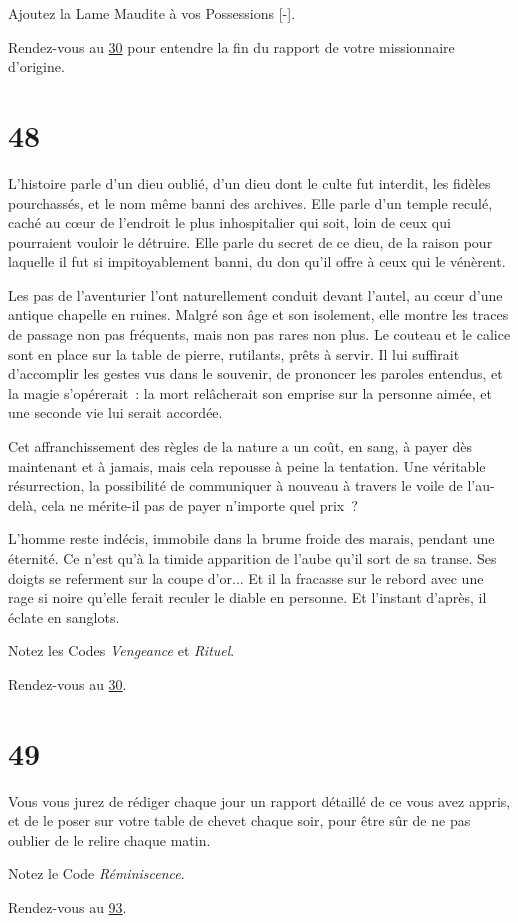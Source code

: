 \documentclass{report}
\newcommand{\gsection}[1]{
    \section{#1}
    \label{section-#1}
}
\newcommand{\glink}[1]{\hyperref[section-#1]{#1}}
\begin{document}
Ajoutez la Lame Maudite à vos Possessions [-].

Rendez-vous au \glink{30} pour entendre la fin du rapport de votre missionnaire d'origine.

\gsection{48}

L'histoire parle d'un dieu oublié, d'un dieu dont le culte fut interdit, les fidèles pourchassés, et le nom même banni des archives. Elle parle d'un temple reculé, caché au cœur de l'endroit le plus inhospitalier qui soit, loin de ceux qui pourraient vouloir le détruire. Elle parle du secret de ce dieu, de la raison pour laquelle il fut si impitoyablement banni, du don qu'il offre à ceux qui le vénèrent.

Les pas de l'aventurier l'ont naturellement conduit devant l'autel, au cœur d'une antique chapelle en ruines. Malgré son âge et son isolement, elle montre les traces de passage non pas fréquents, mais non pas rares non plus. Le couteau et le calice sont en place sur la table de pierre, rutilants, prêts à servir. Il lui suffirait d'accomplir les gestes vus dans le souvenir, de prononcer les paroles entendus, et la magie s'opérerait : la mort relâcherait son emprise sur la personne aimée, et une seconde vie lui serait accordée.

Cet affranchissement des règles de la nature a un coût, en sang, à payer dès maintenant et à jamais, mais cela repousse à peine la tentation. Une véritable résurrection, la possibilité de communiquer à nouveau à travers le voile de l'au-delà, cela ne mérite-il pas de payer n'importe quel prix ?

L'homme reste indécis, immobile dans la brume froide des marais, pendant une éternité. Ce n'est qu'à la timide apparition de l'aube qu'il sort de sa transe. Ses doigts se referment sur la coupe d'or... Et il la fracasse sur le rebord avec une rage si noire qu'elle ferait reculer le diable en personne. Et l'instant d'après, il éclate en sanglots.

Notez les Codes \emph{Vengeance} et \emph{Rituel}.

Rendez-vous au \glink{30}.

\gsection{49}

Vous vous jurez de rédiger chaque jour un rapport détaillé de ce vous avez appris, et de le poser sur votre table de chevet chaque soir, pour être sûr de ne pas oublier de le relire chaque matin.

Notez le Code \emph{Réminiscence}.

Rendez-vous au \glink{93}.
\end{document}
